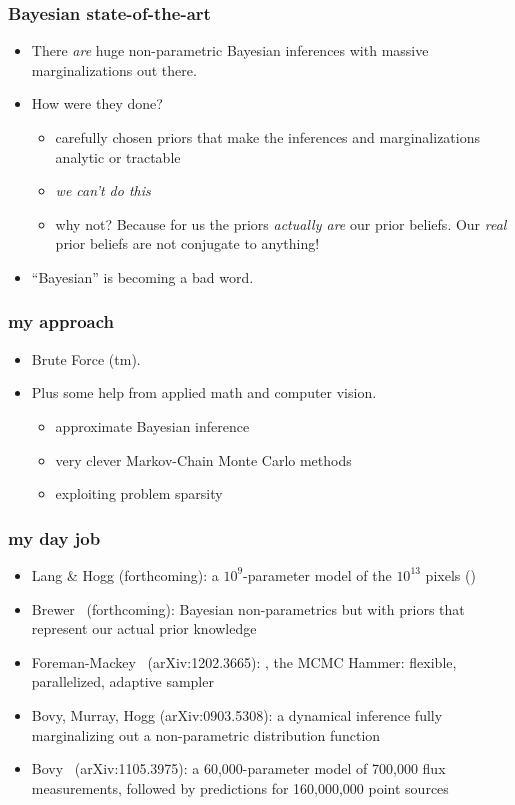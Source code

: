 \documentclass[pdftex]{beamer}
\begin{document}
\begin{frame}
  \frametitle{Bayesian state-of-the-art}
  \begin{itemize}
  \item There \emph{are} huge non-parametric Bayesian inferences with
    massive marginalizations out there.
  \item How were they done?
    \begin{itemize}
    \item carefully chosen priors that make the inferences and
      marginalizations analytic or tractable
    \item \emph{we can't do this}
    \item why not?  Because for us the priors \emph{actually are} our
      prior beliefs.  Our \emph{real} prior beliefs are not conjugate
      to anything!
    \end{itemize}
  \item ``Bayesian'' is becoming a bad word.
  \end{itemize}
\end{frame}

\begin{frame}
  \frametitle{my approach}
  \begin{itemize}
  \item<2-> Brute Force (tm).
  \item<3-> Plus some help from applied math and computer vision.
    \begin{itemize}
    \item approximate Bayesian inference
    \item very clever Markov-Chain Monte Carlo methods
    \item exploiting problem sparsity
    \end{itemize}
  \end{itemize}
\end{frame}

\begin{frame}
  \frametitle{my day job}
  \begin{itemize}
  \item Lang \& Hogg {\small(forthcoming)}: a $10^9$-parameter model of the
    $10^{13}$  pixels ()
  \item Brewer \etal\ {\small(forthcoming)}: Bayesian non-parametrics but with
    priors that represent our actual prior knowledge
  \item Foreman-Mackey \etal\ {\small(arXiv:1202.3665)}:
    , the MCMC Hammer: flexible, parallelized, adaptive
    sampler
  \item Bovy, Murray, Hogg {\small(arXiv:0903.5308)}: a dynamical inference
    fully marginalizing out a non-parametric distribution function
  \item Bovy \etal\ {\small(arXiv:1105.3975)}: a 60,000-parameter model of
    700,000 flux measurements, followed by predictions for 160,000,000
    point sources
  \end{itemize}
\end{frame}
\end{document}
